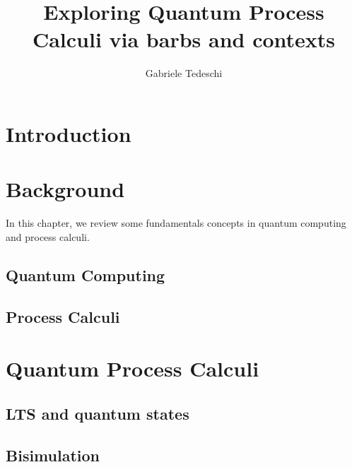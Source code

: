 \documentclass[10pt,a4paper, titlepage]{report}
\title{Exploring Quantum Process Calculi via barbs and contexts }
\author{Gabriele Tedeschi}
\begin{document}
\maketitle

\tableofcontents

\chapter{Introduction}

\chapter{Background}
In this chapter, we review some fundamentals concepts in quantum computing and process calculi.

\section{Quantum Computing}


\section{Process Calculi}	





\chapter{Quantum Process Calculi}



\section{LTS and quantum states}


\section{Bisimulation}

\end{document}
